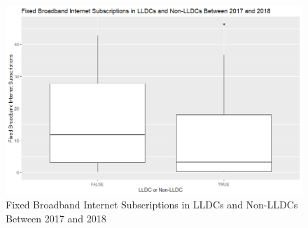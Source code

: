 \documentclass[15pt]{article}
\begin{document}
\begin{figure}[H]
    \centering
    \includegraphics[scale = 0.7]{Part2_box.png}
    \caption{Fixed Broadband Internet Subscriptions in LLDCs and Non-LLDCs Between 2017 and 2018}
\end{figure}
\end{document}
